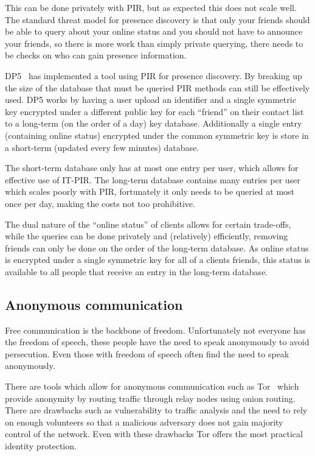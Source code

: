 This can be done privately with PIR, but as expected this does not scale well.
The standard threat model for presence discovery is that only your friends
should be able to query about your online status and you should not have to
announce your friends, so there is more work than simply private querying, there
needs to be checks on who can gain presence information.

DP5~\cite{borisov2015dp5} has implemented a tool using PIR for presence
discovery. By breaking up the size of the database that must be queried PIR
methods can still be effectively used. DP5 works by having a user upload an
identifier and a single symmetric key encrypted under a different public key for
each ``friend'' on their contact list to a long-term (on the order of a day) key
database. Additionally a single entry (containing online status) encrypted under
the common symmetric key is store in a short-term (updated every few minutes)
database. 

The short-term database only has at most one entry per user, which allows for
effective use of IT-PIR. The long-term database contains many entries per user
which scales poorly with PIR, fortunately it only needs to be queried at most
once per day, making the costs not too prohibitive. 

The dual nature of the ``online status'' of clients allows for certain
trade-offs, while the queries can be done privately and (relatively)
efficiently, removing friends can only be done on the order of the long-term
database. As online status is encrypted under a single symmetric key for all of
a clients friends, this status is available to all people that receive an entry
in the long-term database.

\subsection{Anonymous communication}\label{sec:anonymousCommunication}
Free communication is the backbone of freedom. Unfortunately not everyone has
the freedom of speech, these people have the need to speak anonymously to avoid
persecution. Even those with freedom of speech often find the need to speak
anonymously.

There are tools which allow for anonymous communication such as
Tor~\cite{syverson2004tor} which provide anonymity by routing traffic through
relay nodes using onion routing. There are drawbacks such as vulnerability to
traffic analysis and the need to rely on enough volunteers so that a malicious
adversary does not gain majority control of the network. Even with these
drawbacks Tor offers the most practical identity protection. 

